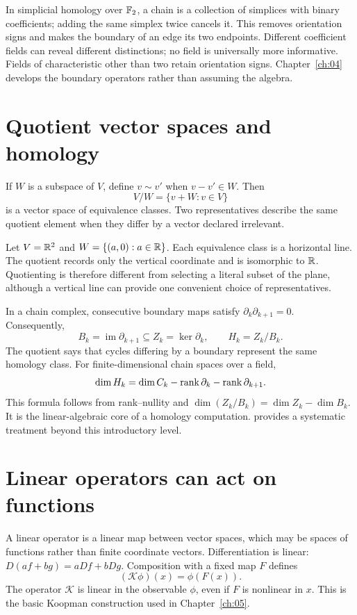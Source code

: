 In simplicial homology over \(\mathbb{F}_2\), a chain is a collection of simplices with binary coefficients; adding the same simplex twice cancels it. This removes orientation signs and makes the boundary of an edge its two endpoints. Different coefficient fields can reveal different distinctions; no field is universally more informative. Fields of characteristic other than two retain orientation signs. Chapter~\ref{ch:04} develops the boundary operators rather than assuming the algebra.

\section{Quotient vector spaces and homology}
If \(W\) is a subspace of \(V\), define \(v\sim v'\) when \(v-v'\in W\). Then
\[
V/W=\{v+W:v\in V\}
\]
is a vector space of equivalence classes. Two representatives describe the same quotient element when they differ by a vector declared irrelevant.

\begin{example}
Let \(V=\mathbb{R}^2\) and \(W=\{(a,0):a\in\mathbb{R}\}\). Each equivalence class is a horizontal line. The quotient records only the vertical coordinate and is isomorphic to \(\mathbb{R}\). Quotienting is therefore different from selecting a literal subset of the plane, although a vertical line can provide one convenient choice of representatives.
\end{example}

In a chain complex, consecutive boundary maps satisfy \(\partial_k\partial_{k+1}=0\). Consequently,
\[
B_k=\operatorname{im}\partial_{k+1}
\subseteq Z_k=\ker\partial_k,
\qquad H_k=Z_k/B_k.
\]
The quotient says that cycles differing by a boundary represent the same homology class. For finite-dimensional chain spaces over a field,
\[
\dim H_k
=\dim C_k-\operatorname{rank}\partial_k-\operatorname{rank}\partial_{k+1}.
\]
This formula follows from rank--nullity and \(\dim(Z_k/B_k)=\dim Z_k-\dim B_k\). It is the linear-algebraic core of a homology computation. \citet{hatcher2002} provides a systematic treatment beyond this introductory level.

\section{Linear operators can act on functions}
A linear operator is a linear map between vector spaces, which may be spaces of functions rather than finite coordinate vectors. Differentiation is linear: \(D(af+bg)=aDf+bDg\). Composition with a fixed map \(F\) defines
\[
(\mathcal K\phi)(x)=\phi(F(x)).
\]
The operator \(\mathcal K\) is linear in the observable \(\phi\), even if \(F\) is nonlinear in \(x\). This is the basic Koopman construction used in Chapter~\ref{ch:05}.

